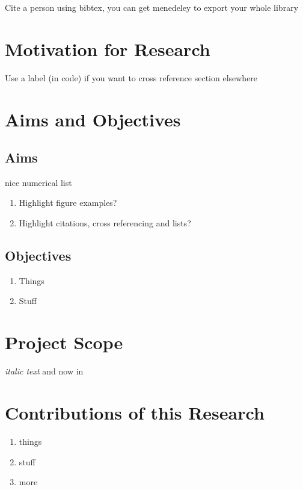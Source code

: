 Cite a person using bibtex, you can get menedeley to export your whole library \cite{Cho2012} 



\section{Motivation for Research} \label{Attachment} 

Use a label (in code) if you want to cross reference section elsewhere


\section{Aims and Objectives}


\subsection{Aims}

nice numerical list

\begin{enumerate}
	\item Highlight figure examples?
	\item Highlight citations, cross referencing and lists?
\end{enumerate}

\subsection{Objectives}

\begin{enumerate}
	\item Things
	\item Stuff
\end{enumerate}



\section{Project Scope}

 \textit{italic text}  and now in 
 




\section{Contributions of this Research}
\begin{enumerate}
	\item things
	\item stuff
	\item more
\end{enumerate}


